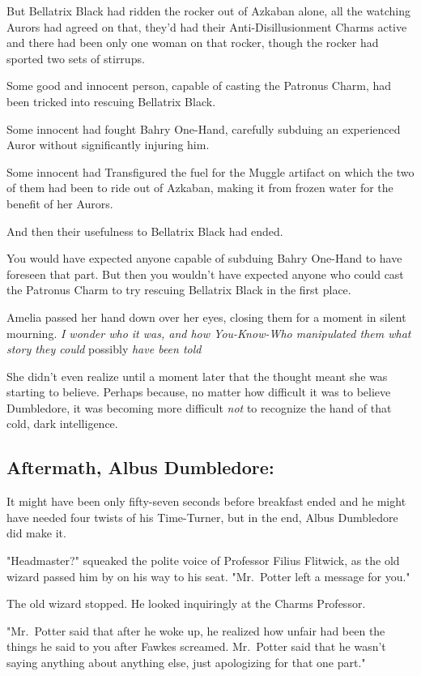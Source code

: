 But Bellatrix Black had ridden the rocker out of Azkaban alone, all the
watching Aurors had agreed on that, they'd had their Anti-Disillusionment
Charms active and there had been only one woman on that rocker, though the
rocker had sported two sets of stirrups.

Some good and innocent person, capable of casting the Patronus Charm, had been
tricked into rescuing Bellatrix Black.

Some innocent had fought Bahry One-Hand, carefully subduing an experienced
Auror without significantly injuring him.

Some innocent had Transfigured the fuel for the Muggle artifact on which the
two of them had been to ride out of Azkaban, making it from frozen water for
the benefit of her Aurors.

And then their usefulness to Bellatrix Black had ended.

You would have expected anyone capable of subduing Bahry One-Hand to have
foreseen that part. But then you wouldn't have expected anyone who could cast
the Patronus Charm to try rescuing Bellatrix Black in the first place.

Amelia passed her hand down over her eyes, closing them for a moment in silent
mourning. \emph{I wonder who it was, and how You-Know-Who manipulated
them{\el} what story they could} possibly \emph{have been told{\el}}

She didn't even realize until a moment later that the thought meant she was
starting to believe. Perhaps because, no matter how difficult it was to believe
Dumbledore, it was becoming more difficult \emph{not} to recognize the hand of
that cold, dark intelligence.
\sbreak
\vspace{-2\baselineskip}
\subsection{Aftermath, Albus Dumbledore:}

It might have been only fifty-seven seconds before breakfast ended and he might
have needed four twists of his Time-Turner, but in the end, Albus Dumbledore
did make it.

"Headmaster?" squeaked the polite voice of Professor Filius Flitwick, as the
old wizard passed him by on his way to his seat. "Mr.~Potter left a message for
you."

The old wizard stopped. He looked inquiringly at the Charms Professor.

"Mr.~Potter said that after he woke up, he realized how unfair had been the
things he said to you after Fawkes screamed. Mr.~Potter said that he wasn't
saying anything about anything else, just apologizing for that one part."

